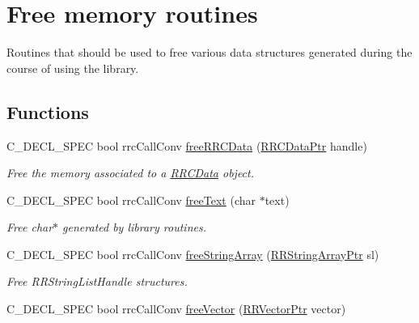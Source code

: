 \hypertarget{group__free_routines}{\section{Free memory routines}
\label{group__free_routines}
}


Routines that should be used to free various data structures generated during the course of using the library.  


\subsection*{Functions}
\begin{DoxyCompactItemize}
\item 
\hypertarget{group__free_routines_gaca3178e98973909708974aedef4ece46}{C\-\_\-\-D\-E\-C\-L\-\_\-\-S\-P\-E\-C bool rrc\-Call\-Conv \hyperlink{group__free_routines_gaca3178e98973909708974aedef4ece46}{free\-R\-R\-C\-Data} (\hyperlink{rrc__types_8h_a9da8b124eb9c3c0045f8926c6a420b4a}{R\-R\-C\-Data\-Ptr} handle)}\label{group__free_routines_gaca3178e98973909708974aedef4ece46}

\begin{DoxyCompactList}\small\item\em Free the memory associated to a \hyperlink{struct_r_r_c_data}{R\-R\-C\-Data} object. \end{DoxyCompactList}\item 
\hypertarget{group__free_routines_gae36f30c608631d163e10860353e45e10}{C\-\_\-\-D\-E\-C\-L\-\_\-\-S\-P\-E\-C bool rrc\-Call\-Conv \hyperlink{group__free_routines_gae36f30c608631d163e10860353e45e10}{free\-Text} (char $\ast$text)}\label{group__free_routines_gae36f30c608631d163e10860353e45e10}

\begin{DoxyCompactList}\small\item\em Free char$\ast$ generated by library routines. \end{DoxyCompactList}\item 
C\-\_\-\-D\-E\-C\-L\-\_\-\-S\-P\-E\-C bool rrc\-Call\-Conv \hyperlink{group__free_routines_gaa929a9a3e6a4b4fe2bf6c260266f0b5a}{free\-String\-Array} (\hyperlink{rrc__types_8h_a7c9475df6c7337d99482b13a365e7596}{R\-R\-String\-Array\-Ptr} sl)
\begin{DoxyCompactList}\small\item\em Free R\-R\-String\-List\-Handle structures. \end{DoxyCompactList}\item 
\hypertarget{group__free_routines_gaa6881948e250978168f7661087a27974}{C\-\_\-\-D\-E\-C\-L\-\_\-\-S\-P\-E\-C bool rrc\-Call\-Conv \hyperlink{group__free_routines_gaa6881948e250978168f7661087a27974}{free\-Vector} (\hyperlink{rrc__types_8h_a3be72d6006034fd349f753d2bf441bf7}{R\-R\-Vector\-Ptr} vector)}\label{group__free_routines_gaa6881948e250978168f7661087a27974}


\end{DoxyCompactItemize}

